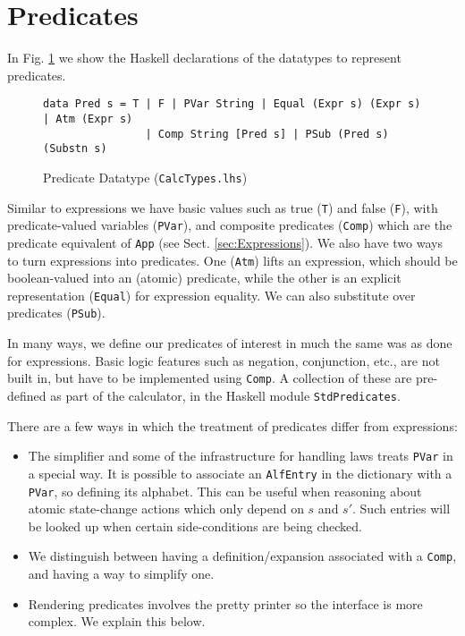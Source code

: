 \section{Predicates}\label{sec:Predicates}

In Fig. \ref{fig:pred-types} we show the Haskell declarations
of the datatypes to represent predicates.
\begin{figure}[tb]
\begin{verbatim}
data Pred s = T | F | PVar String | Equal (Expr s) (Expr s) | Atm (Expr s) 
                | Comp String [Pred s] | PSub (Pred s) (Substn s)
\end{verbatim}
  \caption{Predicate Datatype (\texttt{CalcTypes.lhs})}
  \label{fig:pred-types}
\end{figure}

Similar to expressions we have basic values such as true (\texttt{T})
and false (\texttt{F}),
 with predicate-valued variables (\texttt{PVar}),
and composite predicates (\texttt{Comp}) which are the predicate equivalent
of \texttt{App} (see Sect. \ref{sec:Expressions}).
We also have two ways to turn expressions into predicates.
One (\texttt{Atm}) lifts an expression, which should be boolean-valued
into an (atomic) predicate,
while the other is an explicit representation (\texttt{Equal})
for expression equality.
We can also substitute over predicates (\texttt{PSub}).

In many ways,
we define our predicates of interest
in much the same was as done for expressions.
Basic logic features such as negation, conjunction, etc.,
are not built in,
but have to be implemented using \texttt{Comp}.
A collection of these are pre-defined as part of the calculator,
in the Haskell module \texttt{StdPredicates}.

There are a few ways in which the treatment of predicates
differ from expressions:
\begin{itemize}
  \item
    The simplifier and some of the infrastructure for handling
    laws treats \texttt{PVar} in a special way.
    It is possible to associate an \texttt{AlfEntry} in the dictionary
    with a \texttt{PVar}, so defining its alphabet.
    This can be useful when reasoning about atomic state-change
    actions which only depend on $s$ and $s'$.
    Such entries will be looked up when certain
    side-conditions are being checked.
  \item
    We distinguish between having a definition/expansion associated with a \texttt{Comp},
    and having a way to simplify one.
  \item
    Rendering predicates involves the pretty printer
    so the interface is more complex.
    We explain this below.
\end{itemize}



